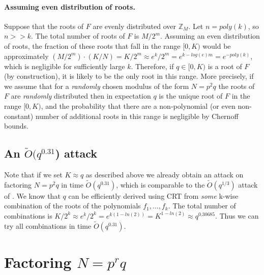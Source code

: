 \documentclass[letterpaper,twocolumn,10pt]{article}
\begin{document}
\paragraph{Assuming even distribution of roots.} Suppose that the roots of $F$ are evenly distributed over $\mathbb{Z}_M$. Let $n = poly(k)$, so $n >> k$. The total number of roots of $F$ is $M/2^m$. Assuming an even distribution of roots, the fraction of these roots that fall in the range $[0,K)$ would be approximately $(M/2^m) \cdot (K/N) = K/2^m \approx e^k/2^m = e^{k - log(e)m} = e^{-poly(k)}$, which is negligible for sufficiently large $k$. Therefore, if $q \in [0, K)$ is a root of $F$ (by construction), it is likely to be the only root in this range. More precisely, if we assume that for a \emph{randomly} chosen modulus of the form $N = p^2 q$ the roots of $F$ are \emph{randomly} distributed then in expectation $q$ is the unique root of $F$ in the range $[0, K)$, and the probability that there are a non-polynomial (or even non-constant) number of additional roots in this range is negligible by Chernoff bounds. 

\subsection{An $\tilde{O}(q^{0.31}$) attack} Note that if we set $K \approx q$ as described above we already obtain an attack on factoring $N = p^2 q$ in time $\tilde{O}(q^{0.31})$, which is comparable to the $\tilde{O}(q^{1/3})$ attack of \cite{dan}. We know that $q$ can be efficiently derived using CRT from \emph{some} k-wise combination of the roots of the polynomials $f_1,...,f_k$. 
The total number of combinations is $K/2^k \approx e^k / 2^k = e^{k(1 - ln(2))} = K^{1 - ln(2)} \approx q^{0.30685}$. Thus we can try all combinations in time $\tilde{O}(q^{0.31})$. 


\section{Factoring $N = p^rq$}
\label{prq}
\end{document}
